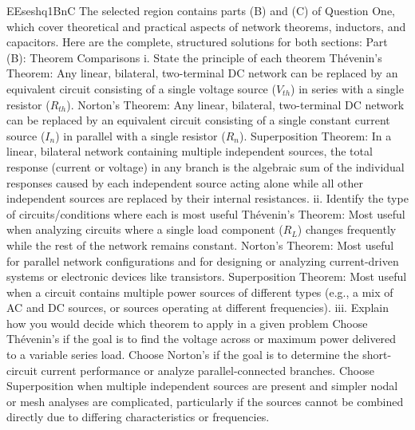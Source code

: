 EEseshq1BnC
The selected region contains parts (B) and (C) of Question One, which cover theoretical and practical aspects of network theorems, inductors, and capacitors.
Here are the complete, structured solutions for both sections:
Part (B): Theorem Comparisons
i. State the principle of each theorem
Thévenin's Theorem: Any linear, bilateral, two-terminal DC network can be replaced by an equivalent circuit consisting of a single voltage source ($V_{th}$) in series with a single resistor ($R_{th}$).
Norton's Theorem: Any linear, bilateral, two-terminal DC network can be replaced by an equivalent circuit consisting of a single constant current source ($I_n$) in parallel with a single resistor ($R_n$).
Superposition Theorem: In a linear, bilateral network containing multiple independent sources, the total response (current or voltage) in any branch is the algebraic sum of the individual responses caused by each independent source acting alone while all other independent sources are replaced by their internal resistances.
ii. Identify the type of circuits/conditions where each is most useful
Thévenin's Theorem: Most useful when analyzing circuits where a single load component ($R_L$) changes frequently while the rest of the network remains constant.
Norton's Theorem: Most useful for parallel network configurations and for designing or analyzing current-driven systems or electronic devices like transistors.
Superposition Theorem: Most useful when a circuit contains multiple power sources of different types (e.g., a mix of AC and DC sources, or sources operating at different frequencies).
iii. Explain how you would decide which theorem to apply in a given problem
Choose Thévenin’s if the goal is to find the voltage across or maximum power delivered to a variable series load.
Choose Norton’s if the goal is to determine the short-circuit current performance or analyze parallel-connected branches.
Choose Superposition when multiple independent sources are present and simpler nodal or mesh analyses are complicated, particularly if the sources cannot be combined directly due to differing characteristics or frequencies.
